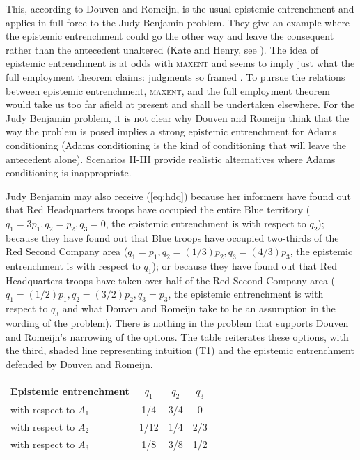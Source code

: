 \documentclass[12pt]{article}
\begin{document}
This, according to Douven and Romeijn, is the usual epistemic
entrenchment and applies in full force to the Judy Benjamin problem.
They give an example where the epistemic entrenchment could go the
other way and leave the consequent rather than the antecedent
unaltered (Kate and Henry, see ). The
idea of epistemic entrenchment is at odds with \textsc{maxent} and
seems to imply just what the full employment theorem claims: judgments
so framed  . To pursue the
relations between epistemic entrenchment, \textsc{maxent}, and the
full employment theorem would take us too far afield at present and
shall be undertaken elsewhere. For the Judy Benjamin problem, it is
not clear why Douven and Romeijn think that the way the problem is
posed implies a strong epistemic entrenchment for Adams conditioning
(Adams conditioning is the kind of conditioning that will leave the
antecedent alone). Scenarios II-III provide realistic alternatives
where Adams conditioning is inappropriate. 

Judy Benjamin may also receive ({\ref{eq:hdq}}) because her informers
have found out that Red Headquarters troops have occupied the entire
Blue territory ($q_{1}=3p_{1},q_{2}=p_{2},q_{3}=0$, the epistemic
entrenchment is with respect to $q_{2}$); because they have found out
that Blue troops have occupied two-thirds of the Red Second Company
area ($q_{1}=p_{1},q_{2}=(1/3)p_{2},q_{3}=(4/3)p_{3}$, the epistemic
entrenchment is with respect to $q_{1}$); or because they have found
out that Red Headquarters troops have taken over half of the Red
Second Company area ($q_{1}=(1/2)p_{1},q_{2}=(3/2)p_{2},q_{3}=p_{3}$,
the epistemic entrenchment is with respect to $q_{3}$ and what Douven
and Romeijn take to be an assumption in the wording of the problem).
There is nothing in the problem that supports Douven and Romeijn's
narrowing of the options. The table reiterates these options, with the
third, shaded line representing intuition (T1) and the epistemic
entrenchment defended by Douven and Romeijn.

\begin{tabular}{|l|c|c|c|}\hline
Epistemic entrenchment & $q_{1}$ & $q_{2}$ & $q_{3}$ \\ \hline
with respect to $A_{1}$ & 1/4 & 3/4 & 0 \\ \hline
with respect to $A_{2}$ & 1/12 & 1/4 & 2/3 \\ \hline
with respect to $A_{3}$ & 1/8 & 3/8 & 1/2 \\ \hline
\end{tabular}
\end{document}
